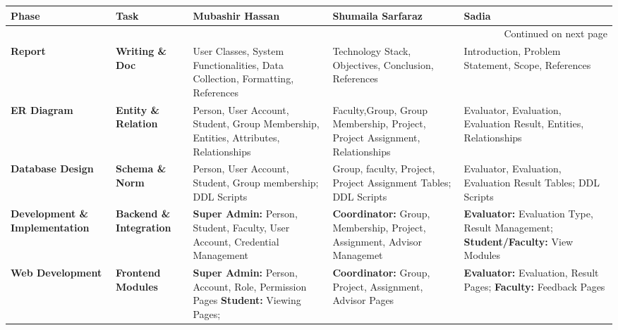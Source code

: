 \documentclass[12pt,a4paper]{report}
\begin{document}
\scriptsize
\begin{longtable}{|p{1.6cm}|p{1.6cm}|p{3.0cm}|p{3.0cm}|p{3.0cm}|}
    \hline
    \textbf{Phase} &
    \textbf{Task} &
    \textbf{Mubashir Hassan} &
    \textbf{Shumaila Sarfaraz} &
    \textbf{Sadia} \\
    \hline
    \endfirsthead
    
    
    \hline
    \multicolumn{5}{|r|}{{Continued on next page}} \\
    \endfoot
    
    \hline
    \endlastfoot
    
    \textbf{Report} &
    \textbf{Writing \& Doc} &
        User Classes, System Functionalities, Data Collection, Formatting, References &
        Technology Stack, Objectives, Conclusion, References &
        Introduction, Problem Statement, Scope, References \\
    \hline
    
    \textbf{ER Diagram} &
    \textbf{Entity \& Relation} &
        Person, User Account, Student, Group Membership, Entities,  Attributes, Relationships &
        Faculty,Group, Group Membership, Project, Project Assignment, Relationships &
        Evaluator, Evaluation, Evaluation Result, Entities, Relationships \\
    \hline
    
  
    \textbf{Database Design} &
    \textbf{Schema \& Norm} &
        Person, User Account, Student, Group membership; DDL Scripts &
        Group, faculty, Project, Project Assignment Tables; DDL Scripts &
        Evaluator, Evaluation, Evaluation Result Tables; DDL Scripts \\
    \hline
    
    \textbf{Development \& Implementation} &
    \textbf{Backend \& Integration} &
        \textbf{Super Admin:} Person, Student, Faculty, User Account, Credential Management &
        \textbf{Coordinator:} Group, Membership, Project, Assignment, Advisor Managemet &
        \textbf{Evaluator:} Evaluation Type, Result Management; \textbf{Student/Faculty:} View Modules \\
    \hline
    

    \textbf{Web Development} &
    \textbf{Frontend Modules} &
        \textbf{Super Admin:} Person, Account, Role, Permission Pages \textbf{Student:} Viewing Pages; &
        \textbf{Coordinator:} Group, Project, Assignment, Advisor Pages &
        \textbf{Evaluator:} Evaluation, Result Pages;  \textbf{Faculty:} Feedback Pages \\
    \hline
    
\end{longtable}
\end{document}
